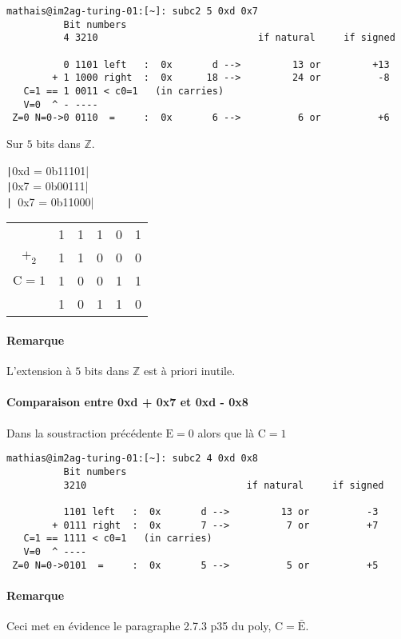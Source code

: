 \documentclass[french, 12pt, a4paper]{article}
\begin{document}
\begin{verbatim}
mathais@im2ag-turing-01:[~]: subc2 5 0xd 0x7
		  Bit numbers
		  4 3210                            if natural     if signed

		  0 1101 left   :  0x       d -->         13 or         +13
		+ 1 1000 right  :  0x      18 -->         24 or          -8
   C=1 == 1 0011 < c0=1   (in carries)
   V=0  ^ - ---- 
 Z=0 N=0->0 0110  =     :  0x       6 -->          6 or          +6
\end{verbatim}

Sur $5$ bits dans $\mathbb{Z}$.

\texttt|0xd = 0b11101|	\\
\texttt|0x7 = 0b00111|	\\
\texttt|~0x7 = 0b11000|

\begin{tabular}[c]{cccccc}
					& 1 & 1 & 1 & 0 & 1	\\
$+_2$				& 1 & 1 & 0 & 0 & 0 \\
$\mathrm{C} = 1$ 	& 1 & 0 & 0 & 1 & 1 \\	\cline{2-6}
					& 1 & 0 & 1 & 1 & 0 \\
\end{tabular}

\paragraph{Remarque}

L'extension à $5$ bits dans $\mathbb{Z}$ est à priori inutile.

\paragraph{Comparaison entre 0xd + 0x7 et 0xd - 0x8}

Dans la soustraction précédente $\mathrm{E} = 0$ alors que là $\mathrm{C} = 1$

\begin{verbatim}
mathias@im2ag-turing-01:[~]: subc2 4 0xd 0x8
		  Bit numbers
		  3210                            if natural     if signed

		  1101 left   :  0x       d -->         13 or          -3
		+ 0111 right  :  0x       7 -->          7 or          +7
   C=1 == 1111 < c0=1   (in carries)
   V=0  ^ ---- 
 Z=0 N=0->0101  =     :  0x       5 -->          5 or          +5
\end{verbatim}

\paragraph{Remarque}

Ceci met en évidence le paragraphe 2.7.3 p35 du poly, $\mathrm{C} = \mathrm{\bar{E}}$.
\end{document}
